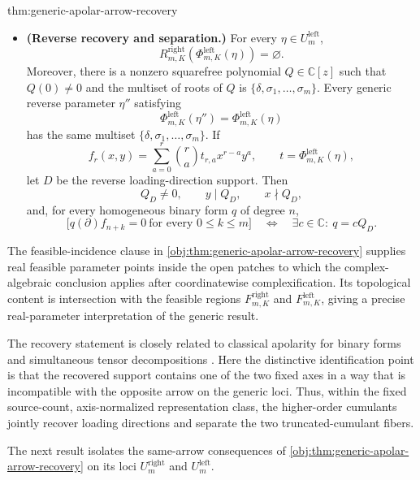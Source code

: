 \documentclass[11pt]{article}
\begin{document}
\begin{theoremv}{thm:generic-apolar-arrow-recovery}
\begin{itemize}
\item \textbf{(Reverse recovery and separation.)} For every \(\eta\in U_m^{\mathrm{left}}\),
\[
R^{\mathrm{right}}_{m,K}\!\left(\Phi^{\mathrm{left}}_{m,K}(\eta)\right)=\varnothing.
\]
Moreover, there is a nonzero squarefree polynomial \(Q\in\mathbb C[z]\) such that
\(Q(0)\neq0\) and the multiset of roots of \(Q\) is
\(\{\delta,\sigma_1,\ldots,\sigma_m\}\). Every generic reverse parameter \(\eta''\) satisfying
\[
\Phi^{\mathrm{left}}_{m,K}(\eta'')=
\Phi^{\mathrm{left}}_{m,K}(\eta)
\]
has the same multiset \(\{\delta,\sigma_1,\ldots,\sigma_m\}\).  If
\[
f_r(x,y)=\sum_{a=0}^{r}\binom{r}{a}t_{r,a}x^{r-a}y^a,
\qquad
t=\Phi^{\mathrm{left}}_{m,K}(\eta),
\]
let \(D\) be the reverse loading-direction support. Then
\[
Q_D\neq0,\qquad y\mid Q_D,\qquad x\nmid Q_D,
\]
and, for every homogeneous binary form \(q\) of degree \(n\),
\[
\bigl[q(\partial)f_{n+k}=0\ \text{for every }0\leq k\leq m\bigr]
\quad\Longleftrightarrow\quad
\exists c\in\mathbb C:\ q=cQ_D.
\]
\end{itemize}
\end{theoremv}

The feasible-incidence clause in \cref{obj:thm:generic-apolar-arrow-recovery} supplies real feasible parameter points inside the open patches to which the complex-algebraic conclusion applies after coordinatewise complexification. Its topological content is intersection with the feasible regions \(F^{\mathrm{right}}_{m,K}\) and \(F^{\mathrm{left}}_{m,K}\), giving a precise real-parameter interpretation of the generic result.

The recovery statement is closely related to classical apolarity for binary forms and simultaneous tensor decompositions \citep{ComonMourrain1996,Landsberg2012,KoldaBader2009}. Here the distinctive identification point is that the recovered support contains one of the two fixed axes in a way that is incompatible with the opposite arrow on the generic loci. Thus, within the fixed source-count, axis-normalized representation class, the higher-order cumulants jointly recover loading directions and separate the two truncated-cumulant fibers.

The next result isolates the same-arrow consequences of \cref{obj:thm:generic-apolar-arrow-recovery} on its loci \(U_m^{\mathrm{right}}\) and \(U_m^{\mathrm{left}}\).
\end{document}
